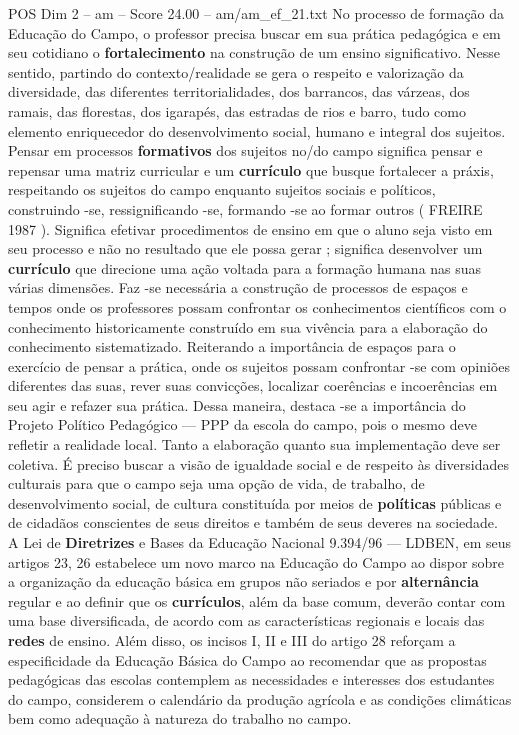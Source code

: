 \begin{textsample}{POS Dim 2 – am – Score 24.00 – am/am\_ef\_21.txt}
No processo de formação da Educação do Campo, o professor precisa buscar em sua prática pedagógica e em seu cotidiano o \textbf{fortalecimento} na construção de um ensino significativo.
Nesse sentido, partindo do contexto/realidade se gera o respeito e valorização da diversidade, das diferentes territorialidades, dos barrancos, das várzeas, dos ramais, das florestas, dos igarapés, das estradas de rios e barro, tudo como elemento enriquecedor do desenvolvimento social, humano e integral dos sujeitos.
Pensar em processos \textbf{formativos} dos sujeitos no/do campo significa pensar e repensar uma matriz curricular e um \textbf{currículo} que busque fortalecer a práxis, respeitando os sujeitos do campo enquanto sujeitos sociais e políticos, construindo -se, ressignificando -se, formando -se ao formar outros ( FREIRE 1987 ).
Significa efetivar procedimentos de ensino em que o aluno seja visto em seu processo e não no resultado que ele possa gerar ; significa desenvolver um \textbf{currículo} que direcione uma ação voltada para a formação humana nas suas várias dimensões.
Faz -se necessária a construção de processos de espaços e tempos onde os professores possam confrontar os conhecimentos científicos com o conhecimento historicamente construído em sua vivência para a elaboração do conhecimento sistematizado.
Reiterando a importância de espaços para o exercício de pensar a prática, onde os sujeitos possam confrontar -se com opiniões diferentes das suas, rever suas convicções, localizar coerências e incoerências em seu agir e refazer sua prática.
Dessa maneira, destaca -se a importância do Projeto Político Pedagógico — PPP da escola do campo, pois o mesmo deve refletir a realidade local.
Tanto a elaboração quanto sua implementação deve ser coletiva.
É preciso buscar a visão de igualdade social e de respeito às diversidades culturais para que o campo seja uma opção de vida, de trabalho, de desenvolvimento social, de cultura constituída por meios de \textbf{políticas} públicas e de cidadãos conscientes de seus direitos e também de seus deveres na sociedade.
A Lei de \textbf{Diretrizes} e Bases da Educação Nacional 9.394/96 — LDBEN, em seus artigos 23, 26 estabelece um novo marco na Educação do Campo ao dispor sobre a organização da educação básica em grupos não seriados e por \textbf{alternância} regular e ao definir que os \textbf{currículos}, além da base comum, deverão contar com uma base diversificada, de acordo com as características regionais e locais das \textbf{redes} de ensino.
Além disso, os incisos I, II e III do artigo 28 reforçam a especificidade da Educação Básica do Campo ao recomendar que as propostas pedagógicas das escolas contemplem as necessidades e interesses dos estudantes do campo, considerem o calendário da produção agrícola e as condições climáticas bem como adequação à natureza do trabalho no campo.

\end{textsample}
